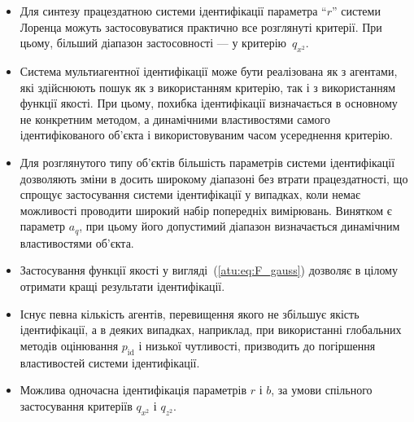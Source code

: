 \begin{itemize}

  \item
    Для синтезу працездатною системи ідентифікації параметра
    ``$r$'' системи Лоренца можуть застосовуватися практично все
    розглянуті критерії. При цьому, більший діапазон застосовності
    --- у критерію~$ q_{x^2} $.

  \item
    Система мультиагентної ідентифікації може бути реалізована
    як з агентами, які здійснюють пошук як з використанням
    критерію, так і з використанням функції якості. При цьому,
    похибка ідентифікації визначається в основному не конкретним
    методом, а динамічними властивостями самого ідентифікованого
    об'єкта і використовуваним часом усереднення критерію.

  \item
    Для розглянутого типу об'єктів більшість параметрів системи
    ідентифікації дозволяють зміни в досить широкому діапазоні
    без втрати працездатності, що спрощує застосування системи
    ідентифікації у випадках, коли немає можливості проводити
    широкий набір попередніх вимірювань. Винятком є параметр
    $a_q$, при цьому його допустимий діапазон визначається динамічним
    властивостями об'єкта.

  \item
    Застосування функції якості у вигляді~(\ref{atu:eq:F_gauss}) дозволяє в
    цілому отримати кращі результати ідентифікації.

  \item
    Існує певна кількість агентів, перевищення якого не збільшує
    якість ідентифікації, а в деяких випадках, наприклад, при
    використанні глобальних методів оцінювання
    $p_\mathrm{id} $ і низької чутливості, призводить до погіршення
    властивостей системи ідентифікації.

  \item
    Можлива одночасна ідентифікація параметрів
    $ r $ і
    $ b $, за умови спільного застосування критеріїв
    $ q_{x^2} $ і
    $ q_{z^2} $.

\end{itemize}








